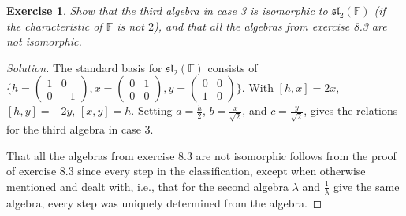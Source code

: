 \documentclass[12pt, fullpage]{article}
\newtheorem{exercise}{Exercise}[section]
\newcommand{\sL}{\mathfrak{sl}}
\newcommand{\F}{\mathbb{F}}
\begin{document}
\begin{exercise}
Show that the third algebra in case 3 is isomorphic to $\sL_2(\F)$
{\rm (}if the characteristic of $\F$ is not $2${\rm )}, and that all
the algebras from exercise 8.3 are not isomorphic.
\end{exercise}
\begin{proof}[Solution]
The standard basis for $\sL_2(\F)$ consists of $\{h=\left(
\begin{array}{ccc} 1 & 0 \\ 0 & -1 \end{array} \right), x=\left(
\begin{array}{ccc} 0 & 1 \\ 0 & 0 \end{array} \right), y=\left(
\begin{array}{ccc} 0 & 0 \\ 1 & 0 \end{array} \right)\}$.  With
$[h,x]=2x$, $[h,y]=-2y$, $[x,y]=h$.  Setting $a=\frac{h}{2}$,
$b=\frac{x}{\sqrt{2}}$, and $c=\frac{y}{\sqrt{2}}$, gives the
relations for the third algebra in case 3.

That all the algebras from exercise 8.3 are not isomorphic follows
from the proof of exercise 8.3 since every step in the classification,
except when otherwise mentioned and dealt with, i.e., that for the
second algebra $\lambda$ and $\frac{1}{\lambda}$ give the same
algebra, every step was uniquely determined from the algebra.
\end{proof}
\end{document}
